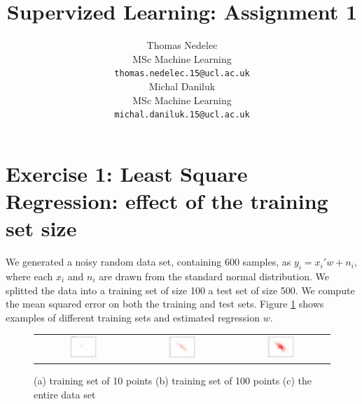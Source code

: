 \documentclass{article} %
\author{
Thomas Nedelec \\
MSc Machine Learning\\
\texttt{thomas.nedelec.15@ucl.ac.uk} \\
\And
Michal Daniluk \\
MSc Machine Learning\\
\texttt{michal.daniluk.15@ucl.ac.uk} \\
}
\title{Supervized Learning: Assignment 1}
\begin{document}
\maketitle

\section{Exercise 1: Least Square Regression: effect of the training set size}
We generated a noisy random data set, containing 600 samples, as $y_i = x_i'w + n_i$, where each $x_i$ and $n_i$ are drawn from the standard normal distribution. We splitted the data into a training set of size 100 a test set of size 500. We compute the mean squared error on both the training and test sets. Figure \ref{fig:lsr} shows examples of different training sets and estimated regression $w$.

 \begin{figure}[H]
\center
\begin{tabular}{ccc}
\includegraphics[width=0.3\textwidth]{10points}&\includegraphics[width=0.3\textwidth]{100points}&\includegraphics[width=0.3\textwidth]{500points}
\end{tabular}
\caption{ (a) training set of 10 points (b) training set of 100 points (c) the entire data set}
\label {fig:lsr}
\end{figure} 
\end{document}
